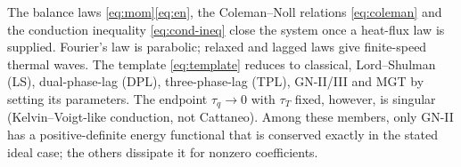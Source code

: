 \begin{summarybox}[Summary]
The balance laws \eqref{eq:mom}\textendash\eqref{eq:en}, the Coleman--Noll relations \eqref{eq:coleman} and the conduction inequality \eqref{eq:cond-ineq} close the system once a heat-flux law is supplied. Fourier's law is parabolic; relaxed and lagged laws give finite-speed thermal waves. The template \eqref{eq:template} reduces to classical, Lord--Shulman (LS), dual-phase-lag (DPL), three-phase-lag (TPL), GN-II/III and MGT by setting its parameters. The endpoint $\tau_q\to0$ with $\tau_T$ fixed, however, is singular (Kelvin--Voigt-like conduction, not Cattaneo). Among these members, only GN-II has a positive-definite energy functional that is conserved exactly in the stated ideal case; the others dissipate it for nonzero coefficients.
\end{summarybox}
